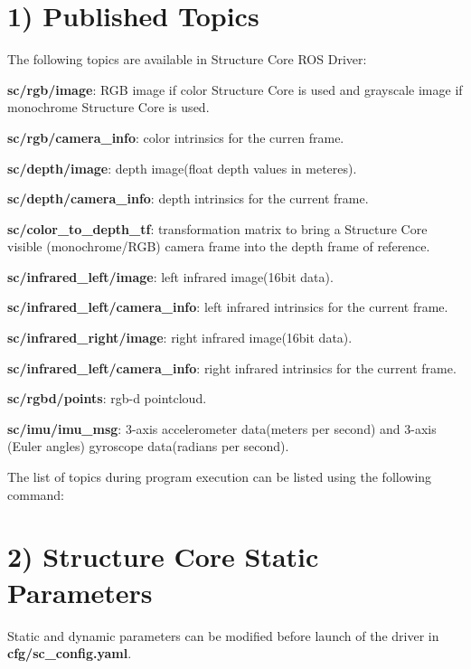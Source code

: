 \hypertarget{ros2_main_features_published2_topics}{}\section{1) Published Topics}\label{ros2_main_features_published2_topics}
The following topics are available in Structure Core R\+OS Driver\+:


\begin{DoxyItemize}
\item {\bfseries{sc/rgb/image}}\+: R\+GB image if color Structure Core is used and grayscale image if monochrome Structure Core is used.
\item {\bfseries{sc/rgb/camera\+\_\+info}}\+: color intrinsics for the curren frame.
\item {\bfseries{sc/depth/image}}\+: depth image(float depth values in meteres).
\item {\bfseries{sc/depth/camera\+\_\+info}}\+: depth intrinsics for the current frame.
\item {\bfseries{sc/color\+\_\+to\+\_\+depth\+\_\+tf}}\+: transformation matrix to bring a Structure Core visible (monochrome/\+R\+GB) camera frame into the depth frame of reference.
\item {\bfseries{sc/infrared\+\_\+left/image}}\+: left infrared image(16bit data).
\item {\bfseries{sc/infrared\+\_\+left/camera\+\_\+info}}\+: left infrared intrinsics for the current frame.
\item {\bfseries{sc/infrared\+\_\+right/image}}\+: right infrared image(16bit data).
\item {\bfseries{sc/infrared\+\_\+left/camera\+\_\+info}}\+: right infrared intrinsics for the current frame.
\item {\bfseries{sc/rgbd/points}}\+: rgb-\/d pointcloud.
\item {\bfseries{sc/imu/imu\+\_\+msg}}\+: 3-\/axis accelerometer data(meters per second) and 3-\/axis (Euler angles) gyroscope data(radians per second).
\end{DoxyItemize}

The list of topics during program execution can be listed using the following command\+:


\begin{DoxyCode}{0}
\end{DoxyCode}
\hypertarget{ros2_main_features_sc_static_params2}{}\section{2) Structure Core Static Parameters}\label{ros2_main_features_sc_static_params2}
Static and dynamic parameters can be modified before launch of the driver in {\bfseries{cfg/sc\+\_\+config.\+yaml}}.

